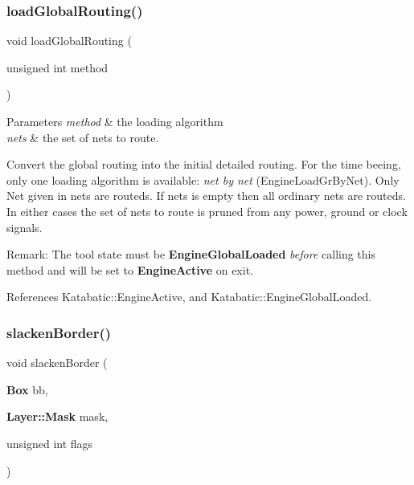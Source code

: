 \subsubsection{\texorpdfstring{load\+Global\+Routing()}{loadGlobalRouting()}}
{\footnotesize\ttfamily void load\+Global\+Routing (\begin{DoxyParamCaption}\item[{unsigned int}]{method }\end{DoxyParamCaption})\hspace{0.3cm}{\ttfamily [virtual]}}


\begin{DoxyParams}{Parameters}
{\em method} & the loading algorithm \\
\hline
{\em nets} & the set of nets to route.\\
\hline
\end{DoxyParams}
Convert the global routing into the initial detailed routing. For the time beeing, only one loading algorithm is available\+: {\itshape net by net} (Engine\+Load\+Gr\+By\+Net). Only Net given in {\ttfamily nets} are routeds. If {\ttfamily nets} is empty then all ordinary nets are routeds. In either cases the set of nets to route is pruned from any power, ground or clock signals.

\begin{DoxyParagraph}{Remark\+: The tool state must be {\bfseries Engine\+Global\+Loaded} {\itshape before} calling this method}
and will be set to {\bfseries Engine\+Active} on exit. 
\end{DoxyParagraph}


References Katabatic\+::\+Engine\+Active, and Katabatic\+::\+Engine\+Global\+Loaded.

\mbox{\label{classKatabatic_1_1KatabaticEngine_a145b36b18fc9149980c5d6bd4bd10e0d}} 
\subsubsection{\texorpdfstring{slacken\+Border()}{slackenBorder()}}
{\footnotesize\ttfamily void slacken\+Border (\begin{DoxyParamCaption}\item[{\textbf{ Box}}]{bb,  }\item[{\textbf{ Layer\+::\+Mask}}]{mask,  }\item[{unsigned int}]{flags }\end{DoxyParamCaption})}


